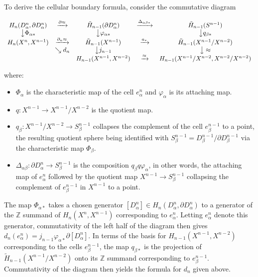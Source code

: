 To derive the cellular boundary formula, consider the commutative diagram

\[
\begin{array}{ccccccc}
H_n(D_\alpha^n, \partial D_\alpha^n) & \xrightarrow{\partial \approx} & \tilde{H}_{n-1}(\partial D_\alpha^n) & \xrightarrow{\Delta_{\alpha\beta*}} & \tilde{H}_{n-1}(S^{n-1}) \\
\big\downarrow \Phi_{\alpha*} & & \big\downarrow \varphi_{\alpha*} & & \big\downarrow q_{\beta*} \\
H_n(X^n, X^{n-1}) & \xrightarrow{\partial_n \approx} & \tilde{H}_{n-1}(X^{n-1}) & \xrightarrow{a_*} & \tilde{H}_{n-1}(X^{n-1}/X^{n-2}) \\
& \searrow d_n & \big\downarrow j_{n-1} & & \big\downarrow \approx \\
& & H_{n-1}(X^{n-1}, X^{n-2}) & \xrightarrow{\approx} & H_{n-1}(X^{n-1}/X^{n-2}, X^{n-2}/X^{n-2})
\end{array}
\]

where:
\begin{itemize}
\item $\Phi_\alpha$ is the characteristic map of the cell $e_\alpha^n$ and $\varphi_\alpha$ is its attaching map.
\item $q: X^{n-1} \to X^{n-1}/X^{n-2}$ is the quotient map.
\item $q_\beta: X^{n-1}/X^{n-2} \to S_\beta^{n-1}$ collapses the complement of the cell $e_\beta^{n-1}$ to a point, the resulting quotient sphere being identified with $S_\beta^{n-1} = D_\beta^{n-1}/\partial D_\beta^{n-1}$ via the characteristic map $\Phi_\beta$.
\item $\Delta_{\alpha\beta}: \partial D_\alpha^n \to S_\beta^{n-1}$ is the composition $q_\beta q\varphi_\alpha$, in other words, the attaching map of $e_\alpha^n$ followed by the quotient map $X^{n-1} \to S_\beta^{n-1}$ collapsing the complement of $e_\beta^{n-1}$ in $X^{n-1}$ to a point.
\end{itemize}

The map $\Phi_{\alpha*}$ takes a chosen generator $[D_\alpha^n] \in H_n(D_\alpha^n, \partial D_\alpha^n)$ to a generator of the $\mathbb{Z}$ summand of $H_n(X^n, X^{n-1})$ corresponding to $e_\alpha^n$. Letting $e_\alpha^n$ denote this generator, commutativity of the left half of the diagram then gives $d_n(e_\alpha^n) = j_{n-1} \varphi_{\alpha*} \partial [D_\alpha^n]$. In terms of the basis for $H_{n-1}(X^{n-1}, X^{n-2})$ corresponding to the cells $e_\beta^{n-1}$, the map $q_{\beta*}$ is the projection of $\tilde{H}_{n-1}(X^{n-1}/X^{n-2})$ onto its $\mathbb{Z}$ summand corresponding to $e_\beta^{n-1}$. Commutativity of the diagram then yields the formula for $d_n$ given above.

